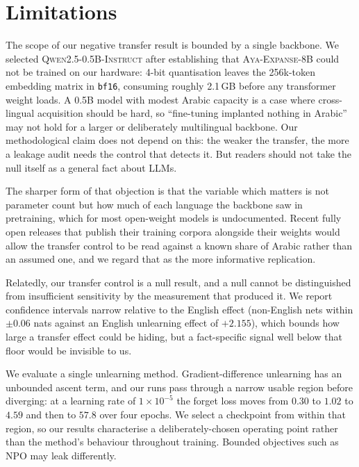 \documentclass[11pt]{article}
\begin{document}
\section*{Limitations}

The scope of our negative transfer result is bounded by a single backbone.
We selected \textsc{Qwen2.5-0.5B-Instruct} after establishing that
\textsc{Aya-Expanse-8B} could not be trained on our hardware: 4-bit
quantisation leaves the 256k-token embedding matrix in \texttt{bf16},
consuming roughly 2.1\,GB before any transformer weight loads. A 0.5B model
with modest Arabic capacity is a case where cross-lingual acquisition should
be hard, so ``fine-tuning implanted nothing in Arabic'' may not hold for a
larger or deliberately multilingual backbone. Our methodological claim does
not depend on this: the weaker the transfer, the more a leakage audit needs
the control that detects it. But readers should not take the null itself as a
general fact about LLMs.

The sharper form of that objection is that the variable which matters is not
parameter count but how much of each language the backbone saw in
pretraining, which for most open-weight models is undocumented. Recent fully
open releases that publish their training corpora alongside their weights
would allow the transfer control to be read against a known share of Arabic
rather than an assumed one, and we regard that as the more informative
replication.

Relatedly, our transfer control is a null result, and a null cannot be
distinguished from insufficient sensitivity by the measurement that produced
it. We report confidence intervals narrow relative to the English effect
(non-English nets within $\pm 0.06$ nats against an English unlearning
effect of $+2.155$), which bounds how large a
transfer effect could be hiding, but a fact-specific signal well below that
floor would be invisible to us.

We evaluate a single unlearning method. Gradient-difference unlearning has an
unbounded ascent term, and our runs pass through a narrow usable region before
diverging: at a learning rate of $1{\times}10^{-5}$ the forget loss moves from
$0.30$ to $1.02$ to $4.59$ and then to $57.8$ over four epochs. We select a
checkpoint from within that region, so our results characterise a
deliberately-chosen operating point rather than the method's behaviour
throughout training. Bounded objectives such as NPO \citep{zhang2024npo} may
leak differently.
\end{document}
